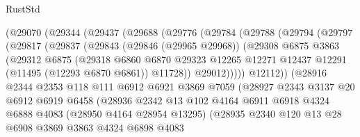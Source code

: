 \begin{lexlean}{RustStd}
\begin{coremodule}
            (@29070
              (@29344
                (@29437
                  (@29688
                    (@29776
                      (@29784
                        (@29788
                          (@29794
                            (@29797
                              (@29817
                                (@29837
                                  (@29843
                                    (@29846 (@29965 @29968))
                                    (@29308
                                      @6875
                                      @3863
                                      (@29312
                                        @6875
                                        (@29318
                                          @6860
                                          @6870
                                          @29323
                                          @12265
                                          @12271
                                          @12437
                                          @12291
                                          (@11495 (@12293 @6870 @6861))
                                          @11728))
                                      @29012)))))
                            @12112))
                        (@28916
                          @2344
                          @2353
                          @118
                          @111
                          @6912
                          @6921
                          @3869
                          @7059
                          (@28927
                            @2343
                            @3137
                            @20
                            @6912
                            @6919
                            @6458
                            (@28936
                              @2342
                              @13
                              @102
                              @4164
                              @6911
                              @6918
                              @4324
                              @6888
                              @4083
                              (@28950 @4164 @28954 @13295)
                              (@28935
                                @2340
                                @120
                                @13
                                @28
                                @6908
                                @3869
                                @3863
                                @4324
                                @6898
                                @4083

\end{coremodule}
\end{lexlean}
